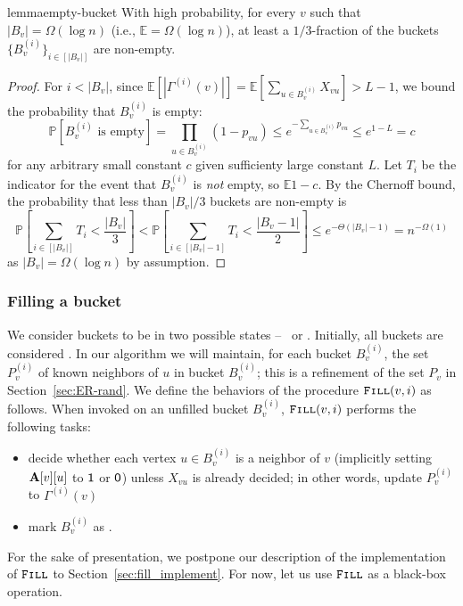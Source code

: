 \begin{restatable}{lemma}{empty-bucket}
\label{lem:empty_bucket}
With high probability, for every $v$ such that $|B_v| = \Omega(\log n)$ (i.e., $\mathbb E = \Omega(\log n)$), at least a $1/3$-fraction of the buckets $\{B_v^{(i)}\}_{i\in[|B_v|]}$ are non-empty.
\end{restatable}
\begin{proof}
For $i < |B_v|$, since $ \mathbb{E} \left[ |\Gamma^{(i)}(v)| \right] =\mathbb{E} \left[ \sum_{u\in B_v^{(i)}} X_{vu} \right] > L-1$, we bound the probability that $B_v^{(i)}$ is empty:
\[
\mathbb P[B_v^{(i)}\textrm{ is empty}] = \prod_{u\in B_v^{(i)}} (1-p_{vu}) \leq e^{-\sum_{u\in B_v^{(i)}} p_{vu}} \leq e^{1-L}=c
\]
for any arbitrary small constant $c$ given sufficienty large constant $L$. Let $T_{i}$ be the indicator for the event that $B_v^{(i)}$ is \emph{not} empty, so $\mathbb E 1-c$. By the Chernoff bound, the probability that less than $|B_v|/3$ buckets are non-empty is 
\[
\textstyle
\mathbb P\left[\sum_{i\in[|B_v|]} T_i<\frac{|B_v|}{3}\right]<\mathbb P\left[\sum_{i\in[|B_v|-1]} T_i<\frac{|B_v-1|}{2}\right]\leq e^{-\Theta(|B_v|-1)} = n^{-\Omega(1)}
\] as $|B_v| = \Omega(\log n)$ by assumption.
\end{proof}




\subsubsection{Filling a bucket}
\label{sec:bucket_filling}

We consider buckets to be in two possible states -- \filled~or \unfilled.
Initially, all buckets are considered \unfilled.
In our algorithm we will maintain, for each bucket $B^{(i)}_v$, the set $P^{(i)}_v$ of known neighbors of $u$ in bucket $B^{(i)}_v$; this is a refinement of the set $P_v$ in Section~\ref{sec:ER-rand}. 
We define the behaviors of the procedure $\texttt{\textsc{Fill}}(v,i)$ as follows. When invoked on an unfilled bucket $B_v^{(i)}$, $\texttt{\textsc{Fill}}(v,i)$ performs the following tasks:
\begin{itemize}
\item decide whether each vertex $u \in B_v^{(i)}$ is a neighbor of $v$ (implicitly setting $\mathbf{A}[v][u]$ to $\mathsf{1}$ or $\mathsf{0}$) unless $X_{vu}$ is already decided; in other words, update $P_v^{(i)}$ to $\Gamma^{(i)}(v)$
\item mark $B_v^{(i)}$ as \filled.
\end{itemize}
For the sake of presentation, we postpone our description of the implementation of $\texttt{\textsc{Fill}}$ to Section~\ref{sec:fill_implement}. For now, let us use $\texttt{\textsc{Fill}}$ as a black-box operation.





